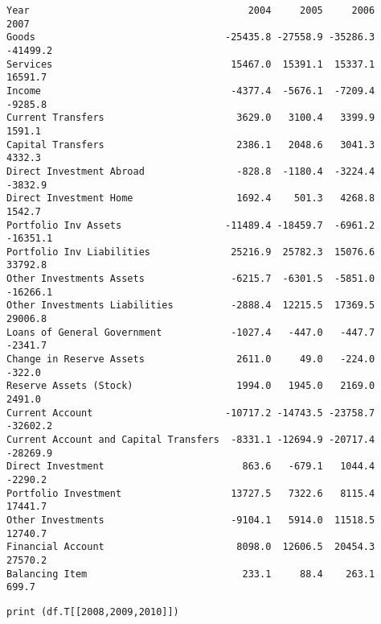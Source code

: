 \documentclass[12pt,fleqn]{article}\usepackage{../../common}
\begin{document}
\begin{verbatim}
Year                                      2004     2005     2006     2007
Goods                                 -25435.8 -27558.9 -35286.3 -41499.2
Services                               15467.0  15391.1  15337.1  16591.7
Income                                 -4377.4  -5676.1  -7209.4  -9285.8
Current Transfers                       3629.0   3100.4   3399.9   1591.1
Capital Transfers                       2386.1   2048.6   3041.3   4332.3
Direct Investment Abroad                -828.8  -1180.4  -3224.4  -3832.9
Direct Investment Home                  1692.4    501.3   4268.8   1542.7
Portfolio Inv Assets                  -11489.4 -18459.7  -6961.2 -16351.1
Portfolio Inv Liabilities              25216.9  25782.3  15076.6  33792.8
Other Investments Assets               -6215.7  -6301.5  -5851.0 -16266.1
Other Investments Liabilities          -2888.4  12215.5  17369.5  29006.8
Loans of General Government            -1027.4   -447.0   -447.7  -2341.7
Change in Reserve Assets                2611.0     49.0   -224.0   -322.0
Reserve Assets (Stock)                  1994.0   1945.0   2169.0   2491.0
Current Account                       -10717.2 -14743.5 -23758.7 -32602.2
Current Account and Capital Transfers  -8331.1 -12694.9 -20717.4 -28269.9
Direct Investment                        863.6   -679.1   1044.4  -2290.2
Portfolio Investment                   13727.5   7322.6   8115.4  17441.7
Other Investments                      -9104.1   5914.0  11518.5  12740.7
Financial Account                       8098.0  12606.5  20454.3  27570.2
Balancing Item                           233.1     88.4    263.1    699.7
\end{verbatim}

\begin{verbatim}
print (df.T[[2008,2009,2010]])
\end{verbatim}
\end{document}
